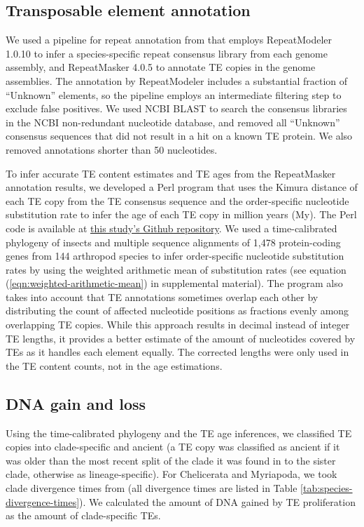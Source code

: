 \subsection*{Transposable element
annotation}

We used a pipeline for repeat annotation from \citet{Petersen2019} that
employs RepeatModeler 1.0.10 \citep{Smit2015a} to infer a
species-specific repeat consensus library from each genome assembly, and
RepeatMasker 4.0.5 \citep{Smit2015} to annotate TE copies in the
genome assemblies. The annotation by RepeatModeler includes a
substantial fraction of ``Unknown'' elements, so the pipeline employs an
intermediate filtering step to exclude false positives. We used NCBI
BLAST to search the consensus libraries in the NCBI non-redundant
nucleotide database, and removed all ``Unknown'' consensus sequences
that did not result in a hit on a known TE protein. We also removed
annotations shorter than 50 nucleotides.

To infer accurate TE content estimates and TE ages from the RepeatMasker
annotation results, we developed a Perl program that uses the Kimura
distance of each TE copy from the TE consensus sequence and the
order-specific nucleotide substitution rate to infer the age of each TE
copy in million years (My). The Perl code is available at
\href{https://github.com/mptrsen/dynamics-of-genome-size}{this study's
Github repository}. We used a time-calibrated phylogeny of insects
\citep{Misof2014} and multiple sequence alignments of 1,478
protein-coding genes from 144 arthropod species \citep{Misof2014} to
infer order-specific nucleotide substitution rates by using the weighted
arithmetic mean of substitution rates (see equation
(\ref{eqn:weighted-arithmetic-mean}) in supplemental
material). The program also takes into account that TE annotations
sometimes overlap each other by distributing the count of affected
nucleotide positions as fractions evenly among overlapping TE copies.
While this approach results in decimal instead of integer TE lengths, it
provides a better estimate of the amount of nucleotides covered by TEs
as it handles each element equally. The corrected lengths were only used
in the TE content counts, not in the age estimations.

\subsection*{DNA gain and loss}

Using the time-calibrated phylogeny and the TE age inferences, we
classified TE copies into clade-specific and ancient (a TE copy was
classified as ancient if it was older than the most recent split of the
clade it was found in to the sister clade, otherwise as
lineage-specific). For Chelicerata and Myriapoda, we took clade
divergence times from \citet{Misof2014} (all divergence times are
listed in Table \ref{tab:species-divergence-times}). We calculated the amount of DNA gained by TE
proliferation as the amount of clade-specific TEs.

